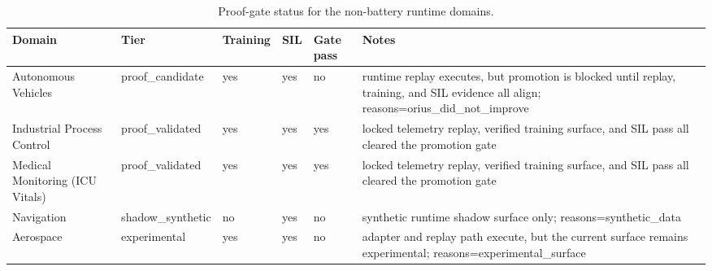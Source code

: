 \begin{table}[htbp]
\centering
\caption{Proof-gate status for the non-battery runtime domains.}
\label{tab:domain-proof-status}
\begin{tabular}{lllllp{3.3cm}}
\toprule
Domain & Tier & Training & SIL & Gate pass & Notes \\
\midrule
Autonomous Vehicles & proof\_candidate & yes & yes & no & runtime replay executes, but promotion is blocked until replay, training, and SIL evidence all align; reasons=orius\_did\_not\_improve \\
Industrial Process Control & proof\_validated & yes & yes & yes & locked telemetry replay, verified training surface, and SIL pass all cleared the promotion gate \\
Medical Monitoring (ICU Vitals) & proof\_validated & yes & yes & yes & locked telemetry replay, verified training surface, and SIL pass all cleared the promotion gate \\
Navigation & shadow\_synthetic & no & yes & no & synthetic runtime shadow surface only; reasons=synthetic\_data \\
Aerospace & experimental & yes & yes & no & adapter and replay path execute, but the current surface remains experimental; reasons=experimental\_surface \\
\bottomrule
\end{tabular}
\end{table}
